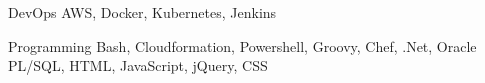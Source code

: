 

\begin{cvskills}

  \cvskill
    {DevOps} %
    {AWS, Docker, Kubernetes, Jenkins} %

  \cvskill
    {Programming} %
    {Bash, Cloudformation, Powershell, Groovy, Chef, .Net, Oracle PL/SQL, HTML, JavaScript, jQuery, CSS} %

\end{cvskills}

